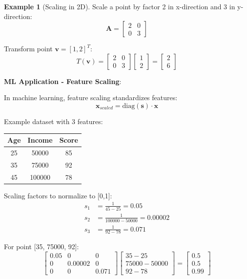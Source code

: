 \documentclass[12pt,a4paper]{article}
\theoremstyle{definition}
\newtheorem{example}{Example}[section]
\begin{document}
\begin{example}[Scaling in 2D]
Scale a point by factor 2 in x-direction and 3 in y-direction:
\[
\mathbf{A} = \begin{bmatrix}
2 & 0 \\
0 & 3
\end{bmatrix}
\]

Transform point $\mathbf{v} = [1, 2]^T$:
\[
T(\mathbf{v}) = \begin{bmatrix}
2 & 0 \\
0 & 3
\end{bmatrix}
\begin{bmatrix}
1 \\ 2
\end{bmatrix}
= \begin{bmatrix}
2 \\ 6
\end{bmatrix}
\]

\textbf{ML Application - Feature Scaling}:

In machine learning, feature scaling standardizes features:
\[
\mathbf{x}_{scaled} = \text{diag}(\mathbf{s}) \cdot \mathbf{x}
\]

Example dataset with 3 features:
\begin{center}
\begin{tabular}{|c|c|c|}
\hline
Age & Income & Score \\
\hline
25 & 50000 & 85 \\
35 & 75000 & 92 \\
45 & 100000 & 78 \\
\hline
\end{tabular}
\end{center}

Scaling factors to normalize to [0,1]:
\begin{align*}
s_1 &= \frac{1}{45 - 25} = 0.05 \\
s_2 &= \frac{1}{100000 - 50000} = 0.00002 \\
s_3 &= \frac{1}{92 - 78} = 0.071
\end{align*}

For point [35, 75000, 92]:
\[
\begin{bmatrix}
0.05 & 0 & 0 \\
0 & 0.00002 & 0 \\
0 & 0 & 0.071
\end{bmatrix}
\begin{bmatrix}
35 - 25 \\ 75000 - 50000 \\ 92 - 78
\end{bmatrix}
= \begin{bmatrix}
0.5 \\ 0.5 \\ 0.99
\end{bmatrix}
\]
\end{example}
\end{document}
